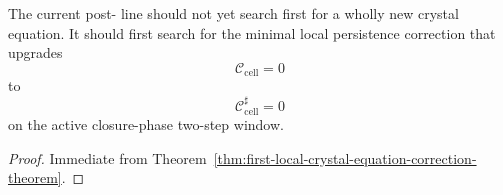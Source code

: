 \begin{corollary}
\label{cor:current-crystal-equation-working-rule}
The current post- line should not yet search first for a wholly new crystal equation. It should first search for the minimal local persistence correction that upgrades
\[
 \mathcal C_{\mathrm{cell}}=0
\]
to
\[
 \mathcal C_{\mathrm{cell}}^{\sharp}=0
\]
on the active closure-phase two-step window.
\end{corollary}

\begin{proof}
Immediate from Theorem~\ref{thm:first-local-crystal-equation-correction-theorem}.
\end{proof}


